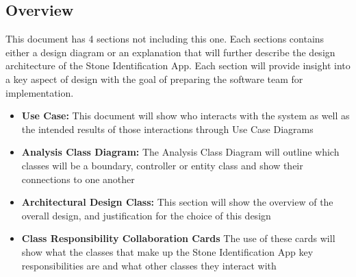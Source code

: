 \documentclass[titlepage]{article}
\begin{document}
\subsection{Overview}{
This document has 4 sections not including this one. Each sections contains either a design diagram or an explanation that will further describe the design architecture of the Stone Identification App. Each section will provide insight into a key aspect of design with the goal of preparing the software team for implementation.
\begin{itemize}
\item \textbf{Use Case:} This document will show who interacts with the system as well as the intended results of those interactions through Use Case Diagrams
\item \textbf{Analysis Class Diagram:} The Analysis Class Diagram will outline which classes will be a boundary, controller or entity class and show their connections to one another
\item \textbf{Architectural Design Class:} This section will show the overview of the overall design, and justification for the choice of this design
\item \textbf{Class Responsibility Collaboration Cards} The use of these cards will show what the classes that make up the Stone Identification App key responsibilities are and what other classes they interact with
\end{itemize}
}
\end{document}
